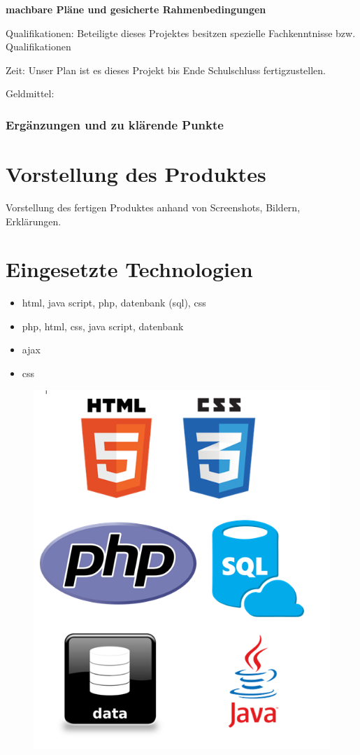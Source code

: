 \textbf {machbare Pläne und gesicherte Rahmenbedingungen}

Qualifikationen: Beteiligte dieses Projektes besitzen spezielle Fachkenntnisse bzw. Qualifikationen

Zeit: Unser Plan ist es dieses Projekt bis Ende Schulschluss fertigzustellen.

Geldmittel: 


\subsection{Ergänzungen und zu klärende Punkte}


\chapter{Vorstellung des Produktes}
Vorstellung des fertigen Produktes anhand von Screenshots, Bildern, Erklärungen.

\chapter{Eingesetzte Technologien}
\begin{itemize}
	\item html, java script, php, datenbank (sql), css
	\item php, html, css, java script, datenbank
	\item ajax
	\item css
\end{itemize}

\begin{figure}
	\centering
	\includegraphics[width=0.7\linewidth]{screenshot013}
	\caption{}
	\label{fig:screenshot013}
\end{figure}


